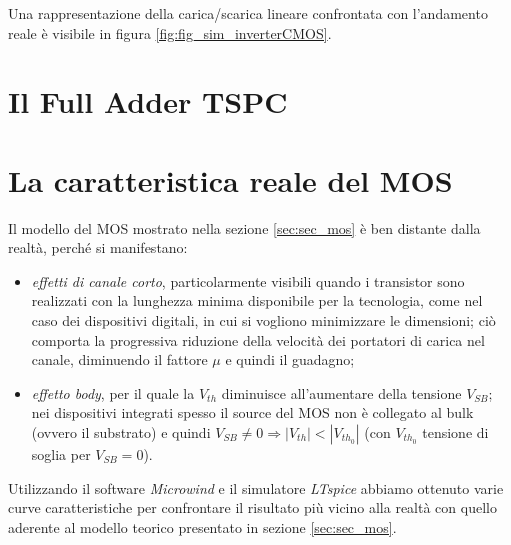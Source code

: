 Una rappresentazione della carica/scarica lineare confrontata con l'andamento reale è visibile in figura \ref{fig:fig_sim_inverterCMOS}.

\section{Il Full Adder TSPC}
\label{sec:sec_fullAdder}

\section{La caratteristica reale del MOS}
\label{sec:sec_caratteristicaMOS}
Il modello del MOS mostrato nella sezione \ref{sec:sec_mos} è ben distante dalla realtà, perché si manifestano:
\begin{itemize}
\item \textit{effetti di canale corto}, particolarmente visibili quando i transistor sono realizzati con la lunghezza minima disponibile per la tecnologia, come nel caso dei dispositivi digitali, in cui si vogliono minimizzare le dimensioni; ciò comporta la progressiva riduzione della velocità dei portatori di carica nel canale, diminuendo il fattore $\mu$ e quindi il guadagno;
\item \textit{effetto body}, per il quale la $V_{th}$ diminuisce all'aumentare della tensione $V_{SB}$; nei dispositivi integrati spesso il source del MOS non è collegato al bulk (ovvero il substrato) e quindi $V_{SB} \neq 0 \Rightarrow \left | V_{th} \right | < \left | V_{th_0} \right | $ (con $V_{th_0}$ tensione di soglia per $V_{SB}=0$).
\end{itemize}

Utilizzando il software \textit{Microwind} e il simulatore \textit{LTspice} abbiamo ottenuto varie curve caratteristiche per confrontare il risultato più vicino alla realtà con quello aderente al modello teorico presentato in sezione \ref{sec:sec_mos}.





